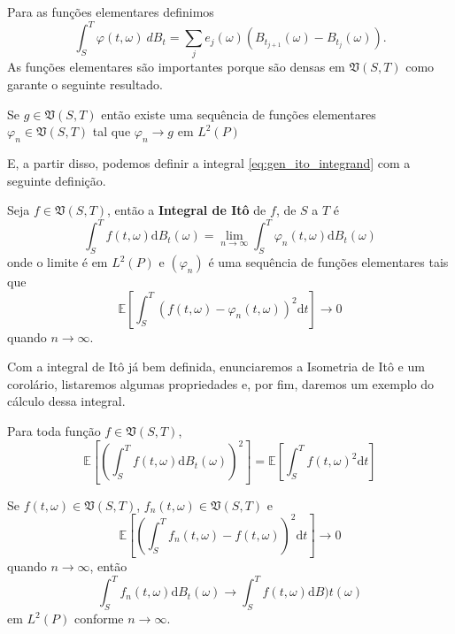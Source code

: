 \documentclass[portrait]{a0poster}	%
\theoremstyle{definition}
\begin{document}
\begin{multicols}{2}
    Para as funções elementares definimos 
    \[
    \int_S^T\varphi(t, \omega)~dB_t=\sum_{j}e_j(\omega)(B_{t_{j+1}}(\omega)-B_{t_j}(\omega)).
    \]
    As funções elementares são importantes porque são densas em $\mathfrak{V}(S,T)$ como garante o seguinte resultado.
    \begin{theorem}
    Se $g\in \mathfrak{V}(S,T)$  então existe uma sequência de funções elementares $\varphi_n\in \mathfrak{V}(S,T)$ tal que $\varphi_n\to g$ em $L^2(P)$
    \end{theorem}

    E, a partir disso, podemos definir a integral \eqref{eq:gen_ito_integrand} com a seguinte definição.

    \begin{definition}
        Seja $f \in \mathfrak{V}(S,T)$, então a \textbf{Integral de Itô} de $f$, de $S$ a $T$ é
        \begin{equation}
            \int_S^T f(t, \omega) \mathrm{d}B_t(\omega) = \lim_{n \to \infty} \int_S^T \varphi_n (t, \omega)  \mathrm{d}B_t(\omega)
        \end{equation}
        onde o limite é em $L^2(P)$ e $( \varphi_n )$ é uma sequência de funções elementares tais que
        \[
            \mathbb{E} \left[ \int_S^T (f(t, \omega) - \varphi_n(t, \omega))^2 \mathrm{d}t \right] \longrightarrow 0
        \] 
        quando $n \to \infty$.
    \end{definition}

    Com a integral de Itô já bem definida, enunciaremos a Isometria de Itô e um corolário, listaremos algumas propriedades e, por fim, daremos um exemplo do cálculo dessa integral.

    \begin{theorem}
        Para toda função $f \in \mathfrak{V}(S,T)$,	
        \begin{equation}
            \mathbb{E}\left[\left( \int_S^T f(t,\omega) \mathrm{d}B_t(\omega) \right)^2 \right] = \mathbb{E} \left[\int_S^T f(t,\omega)^2 \mathrm{d}t \right]
        \end{equation}
    \end{theorem}

    \begin{corollary}\label{cr:ito}
        Se $f(t, \omega) \in \mathfrak{V}(S,T)$, $f_n(t, \omega) \in \mathfrak{V}(S,T)$ e
        \[
            \mathbb{E}\left[\left( \int_S^T f_n(t,\omega) - f(t, \omega) \right)^2 \mathrm{d}t \right] \longrightarrow 0
            \]
        quando $n \to \infty$, então
        \begin{equation}
            \int_S^T f_n(t, \omega) \mathrm{d}B_t(\omega) \longrightarrow \int_S^T f(t, \omega) \mathrm{d} B)t(\omega)
        \end{equation}
        em $L^2(P)$ conforme $n \to \infty$.
    \end{corollary}


\end{multicols}
\end{document}
